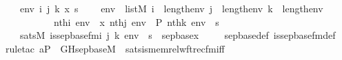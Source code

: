 \begin{isabellebody}
\ \ \ env\ i\ j\ k\ x\ s\ \isanewline
\ \ \ {\isachardoublequoteopen}env\ {\isasymin}\ list{\isacharparenleft}{\kern0pt}M{\isacharparenright}{\kern0pt}{\isachardoublequoteclose}\ {\isachardoublequoteopen}i\ {\isacharless}{\kern0pt}\ length{\isacharparenleft}{\kern0pt}env{\isacharparenright}{\kern0pt}{\isachardoublequoteclose}\ {\isachardoublequoteopen}j\ {\isacharless}{\kern0pt}\ length{\isacharparenleft}{\kern0pt}env{\isacharparenright}{\kern0pt}{\isachardoublequoteclose}\ {\isachardoublequoteopen}k\ {\isacharless}{\kern0pt}\ length{\isacharparenleft}{\kern0pt}env{\isacharparenright}{\kern0pt}{\isachardoublequoteclose}\isanewline
\ \ \ \ \ \ \ \ \ \ {\isachardoublequoteopen}nth{\isacharparenleft}{\kern0pt}i{\isacharcomma}{\kern0pt}\ env{\isacharparenright}{\kern0pt}\ {\isacharequal}{\kern0pt}\ x{\isachardoublequoteclose}\ {\isachardoublequoteopen}nth{\isacharparenleft}{\kern0pt}j{\isacharcomma}{\kern0pt}\ env{\isacharparenright}{\kern0pt}\ {\isacharequal}{\kern0pt}\ P{\isachardoublequoteclose}\ {\isachardoublequoteopen}nth{\isacharparenleft}{\kern0pt}k{\isacharcomma}{\kern0pt}\ env{\isacharparenright}{\kern0pt}\ {\isacharequal}{\kern0pt}\ s{\isachardoublequoteclose}\ \isanewline
\ \ \ {\isachardoublequoteopen}sats{\isacharparenleft}{\kern0pt}M{\isacharcomma}{\kern0pt}\ is{\isacharunderscore}{\kern0pt}sep{\isacharunderscore}{\kern0pt}base{\isacharunderscore}{\kern0pt}fm{\isacharparenleft}{\kern0pt}i{\isacharcomma}{\kern0pt}\ j{\isacharcomma}{\kern0pt}\ k{\isacharparenright}{\kern0pt}{\isacharcomma}{\kern0pt}\ env{\isacharparenright}{\kern0pt}\ {\isasymlongleftrightarrow}\ s\ {\isacharequal}{\kern0pt}\ sep{\isacharunderscore}{\kern0pt}base{\isacharparenleft}{\kern0pt}x{\isacharparenright}{\kern0pt}{\isachardoublequoteclose}\ \isanewline
%
\isadelimproof
\isanewline
\ \ %
\endisadelimproof
%
\isatagproof
{}\isamarkupfalse%
\ sep{\isacharunderscore}{\kern0pt}base{\isacharunderscore}{\kern0pt}def\ is{\isacharunderscore}{\kern0pt}sep{\isacharunderscore}{\kern0pt}base{\isacharunderscore}{\kern0pt}fm{\isacharunderscore}{\kern0pt}def\isanewline
\ \ \isamarkupfalse%
{\isacharparenleft}{\kern0pt}rule{\isacharunderscore}{\kern0pt}tac\ a{\isacharequal}{\kern0pt}P\ \ G{\isacharequal}{\kern0pt}Hsep{\isacharunderscore}{\kern0pt}base{\isacharunderscore}{\kern0pt}M\ \ sats{\isacharunderscore}{\kern0pt}is{\isacharunderscore}{\kern0pt}memrel{\isacharunderscore}{\kern0pt}wftrec{\isacharunderscore}{\kern0pt}fm{\isacharunderscore}{\kern0pt}iff{\isacharparenright}{\kern0pt}\isanewline

\end{isabellebody}

